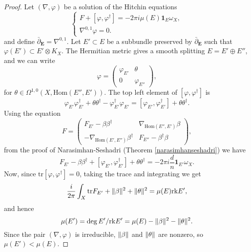 \documentclass[12pt,a4paper]{book}
\theoremstyle{definition} \newtheorem{defn}[thm]{Definition}
\theoremstyle{definition} \newtheorem{ejemplo}[thm]{Example}
\theoremstyle{remark} \newtheorem{rem}[thm]{Remark}
\def\tr{\mathrm{tr}}
\def\rk{\mathrm{rk}}
\def\id{\mathbf{1}}
\def\Hom{\mathrm{Hom}}
\def\delbar{\bar{\partial}}
\newcommand{\ve}[1]{\mathbf{#1}}
\DeclarePairedDelimiter\norm{\lVert}{\rVert}
\begin{document}
	  \begin{proof}
	    Let $(\nabla,\varphi)$ be a solution of the Hitchin equations
	  \begin{equation*}
	    \begin{cases}
	      F+[\varphi,\varphi^\dagger]=-2\pi i \mu(E) \id_E \omega_X, \\
	      \nabla^{0,1}\varphi=0.
	    \end{cases}
	  \end{equation*}
	  and define $\delbar_{\ve{E}}=\nabla^{0,1}$. Let $E'\subset E$ be a subbundle preserved by $\delbar_{\ve{E}}$ such that $\varphi(E')\subset E'\otimes K_X$. The Hermitian metric gives a smooth splitting $E=E'\oplus E''$, and we can write
	  \begin{equation*}
	    \varphi=
	    \left(
	    \begin{array}{cc}
	      \varphi_{E'} & \theta \\
	      0 & \varphi_{E''}
	    \end{array}
	    \right),
	  \end{equation*}
	  for $\theta \in \Omega^{1,0}(X,\Hom(E'',E'))$.
	  The top left element of $[\varphi,\varphi^\dagger]$ is
	  \begin{equation*}
	    \varphi_{E'}\varphi_{E'}^\dagger + \theta\theta^\dagger - \varphi_{E'}^\dagger\varphi_{E'}=[\varphi_{E'},\varphi_{E'}^\dagger] + \theta  \theta^\dagger.
	  \end{equation*}
	  Using the equation
	  \begin{equation*}
  F=\left(
  \begin{array}{cc}
    F_{E'}-\beta\beta^\dagger & \nabla_{\Hom(E'',E')}\beta \\
    -\nabla_{\Hom (E',E'')}\beta^\dagger & F_{E''}-\beta^\dagger \beta
  \end{array}\right),
	  \end{equation*}
	  from the proof of Narasimhan-Seshadri (Theorem \ref{narasimhanseshadri}) we have
	  \begin{equation*}
	    F_{E'}-\beta \beta^{\dagger} + [\varphi_{E'},\varphi_{E'}^\dagger]+\theta \theta^{\dagger}=-2\pi i \frac{d}{n}\id_{E'} \omega_X.
	  \end{equation*}
	  Now, since $\tr[\varphi,\varphi^\dagger]=0$, taking the trace and integrating we get
	  \begin{equation*}
	    \frac{i}{2\pi}\int_X \tr F_{E'} + \norm{\beta}^2 + \norm{\theta}^2  = \mu(E) \rk E',
	  \end{equation*}
	  and hence
	  \begin{equation*}
	   \mu(E')= \deg E'/\rk E'= \mu(E)-\norm{\beta}^2 - \norm{\theta}^2.
	  \end{equation*}
	  Since the pair $(\nabla,\varphi)$ is irreducible, $\norm{\beta}$ and $\norm{\theta}$ are nonzero, so $\mu(E')<\mu(E)$.
	  \end{proof}
\end{document}
